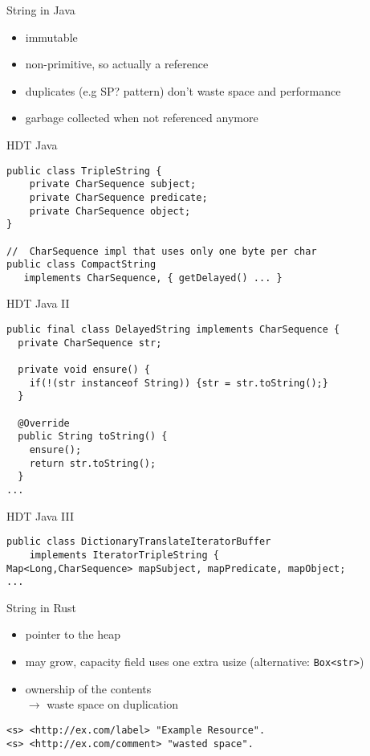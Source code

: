 \documentclass[14pt,aspectratio=169]{beamer}
\newcommand\pro{\item[$+$]}
\newcommand\con{\item[$-$]}
\begin{document}
\begin{frame}{String in Java}
\begin{itemize}
\pro immutable
\pro non-primitive, so actually a reference
\pro duplicates (e.g SP? pattern) don't waste space and performance
\pro garbage collected when not referenced anymore
\end{itemize}
\end{frame}

\begin{frame}[fragile]{HDT Java}
\small
\begin{verbatim}
public class TripleString {
    private CharSequence subject;
    private CharSequence predicate;
    private CharSequence object;
}

//  CharSequence impl that uses only one byte per char
public class CompactString
   implements CharSequence, { getDelayed() ... }
\end{verbatim}
\end{frame}

\begin{frame}[fragile]{HDT Java II}
\small
\begin{verbatim}
public final class DelayedString implements CharSequence {
  private CharSequence str;

  private void ensure() {
    if(!(str instanceof String)) {str = str.toString();}
  }

  @Override
  public String toString() {
    ensure();
    return str.toString();
  }
...
\end{verbatim}
\end{frame}

\begin{frame}[fragile]{HDT Java III}
\small
\begin{verbatim}
public class DictionaryTranslateIteratorBuffer
    implements IteratorTripleString {
Map<Long,CharSequence> mapSubject, mapPredicate, mapObject;
...
\end{verbatim}
\end{frame}

\begin{frame}[fragile]{String in Rust}
\begin{itemize}
\item pointer to the heap
\con may grow, capacity field uses one extra usize (alternative: \texttt{Box<str>})
\con ownership of the contents\\$\rightarrow$ waste space on duplication
\end{itemize}
\begin{verbatim}
<s> <http://ex.com/label> "Example Resource".
<s> <http://ex.com/comment> "wasted space".
\end{verbatim}
\end{frame}
\end{document}
